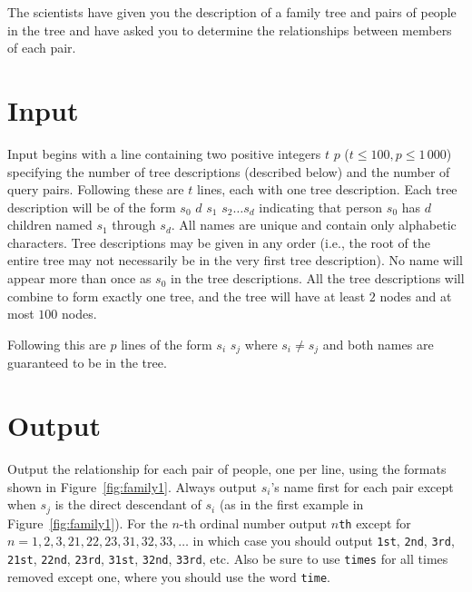 \documentclass[UTF8]{ctexart}
\begin{document}
The scientists have given you the description of a family tree and pairs of people in the tree and have asked you to determine the relationships between members of each pair.

\section*{Input}

Input begins with a line containing two positive integers $t$ $p$ ($t \leq 100, p \leq 1\,000$) specifying the  number of tree descriptions (described below) and the number of query pairs.  Following these are $t$ lines, each with one tree description.  Each tree description will be of the form $s_0$ $d$ $s_1$ $s_2 \ldots s_d$ indicating that person $s_0$ has $d$ children named $s_1$ through $s_d$.  All names are unique and contain only alphabetic characters.  Tree descriptions may be given in any order (i.e., the root of the entire tree may not necessarily be in the very first tree description).  No name will appear more than once as $s_0$ in the tree descriptions.  All the tree descriptions will combine to form exactly one tree, and the tree will have at least $2$ nodes and at most $100$ nodes.

Following this are $p$ lines of the form $s_i$ $s_j$ where $s_i \neq s_j$ and both names are guaranteed to be in the tree.

\section*{Output}

Output the relationship for each pair of people, one per line, using the formats shown in Figure~\ref{fig:family1}.  Always output $s_i$'s name first for each pair except when $s_j$ is the direct descendant of $s_i$ (as in the first example in Figure~\ref{fig:family1}).  For the $n$-th ordinal number output {\tt $n$th} except for $n=1,2,3,21,22,23,31,32,33,\ldots$  in which case you should output {\tt 1st}, {\tt 2nd}, {\tt 3rd}, {\tt 21st}, {\tt 22nd}, {\tt 23rd}, {\tt 31st}, {\tt 32nd}, {\tt 33rd}, etc.  Also be sure to use {\tt times} for all times removed except one, where you should use the word {\tt time}.
\end{document}
